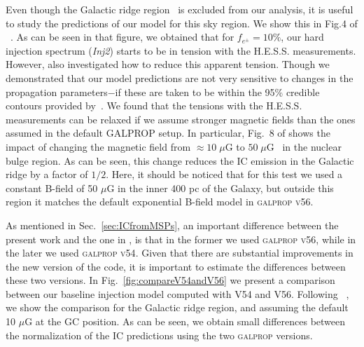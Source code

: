 \documentclass[doublespace,nopageskip]{VTthesis} %
\begin{document}
Even though the Galactic ridge region~\citep{Aharonian:2006au} is excluded from our analysis, it is useful to study the predictions of our model for this sky region. We show this in Fig.4 of ~\citep{Song:2019nrx}. As can be seen in that figure,
we obtained that for $f_{e^\pm} = 10\%$, our hard injection spectrum (\textit{Inj2}) starts to be in tension with the H.E.S.S. measurements. However, \citet{Song:2019nrx} also investigated how to reduce this apparent tension. Though we demonstrated that our model predictions are not very sensitive to changes in the propagation parameters$-$if these are taken to be within the 95\% credible contours provided by~\citet{Johannesson:2016rlh}. We found that the tensions with the H.E.S.S. measurements can be relaxed if we assume stronger magnetic fields than the ones assumed in the default GALPROP setup. In particular, Fig.~8 of \citet{Song:2019nrx} shows the impact of changing the magnetic field from  $\approx 10\; \mu$G to $50\;\mu$G~\citep{Crocker:2010xc} in the nuclear bulge region. As can be seen, this change reduces the IC emission in the Galactic ridge by a factor of $1/2$.  Here, it should be noticed that for this test we used a constant B-field of 50 $\mu$G in the inner 400 pc of the Galaxy, but outside this region it matches the default exponential B-field model in \textsc{galprop v56}.  

As mentioned in Sec.~\ref{sec:ICfromMSPs}, an important difference between the present work and the one in \citep{Song:2019nrx}, is that in the former we used \textsc{galprop v56}, while in the later we used \textsc{galprop v54}. Given that there are substantial improvements in the new version of the code, it is important to estimate the differences between these two versions. In Fig.~\ref{fig:compareV54andV56} we present a comparison between our baseline injection model computed with V54 and V56. Following ~\citep{Song:2019nrx}, we show the comparison for the Galactic ridge region, and assuming the default 10 $\mu$G at the GC position. As can be seen, we obtain small differences between the normalization of the IC predictions using the two \textsc{galprop} versions.
\end{document}

